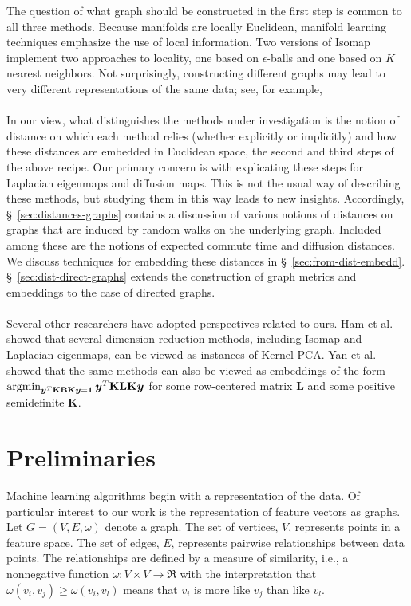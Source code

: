 \documentclass[10pt,twocolumn]{article}
\numberwithin{equation}{section}
\newcommand{\argmin}{\operatornamewithlimits{argmin}}
\begin{document}
The question of what graph should be constructed in the first step is
common to all three methods.  Because manifolds are locally Euclidean,
manifold learning techniques emphasize the use of local information.   
Two versions of Isomap implement two approaches to locality, one
based on $\epsilon$-balls and one based on $K$ nearest neighbors.
Not surprisingly, constructing different graphs may lead to very
different representations of the same data;
 see, for example,
\cite{maier08:_influen,hein07:_conver_laplac} \\ \\
%
%
\noindent
In our view, what distinguishes the methods under investigation is 
the notion of distance on which each method relies (whether explicitly
or implicitly) and how these distances are embedded in Euclidean space, 
the second and third steps of the above recipe.  Our primary 
concern is with explicating these steps for Laplacian eigenmaps
and diffusion maps.  This is not the usual way of describing these methods,
but studying them in this way leads to new insights.
Accordingly, \S~\ref{sec:distances-graphs} contains a discussion of various
notions of distances on graphs that are induced by random walks on the
underlying graph. Included among these are the notions of expected
commute time and diffusion distances. 
We discuss techniques for embedding these
distances in \S~\ref{sec:from-dist-embedd}.
\S~\ref{sec:dist-direct-graphs}
extends the construction of graph metrics and embeddings to the
case of directed graphs. \\ \\
%
\noindent
Several other researchers have adopted perspectives related to ours.
Ham et al.\
 \cite{ham04} showed that several dimension reduction methods, including
Isomap and Laplacian eigenmaps, can be viewed as instances of
Kernel PCA. 
Yan et al.\ 
\cite{yan07:_graph_embed_exten} showed that the same
methods can also be viewed as embeddings of the
form $\argmin_{\bm{y}^{T} \mathbf{K}\mathbf{B} \mathbf{K} \bm{y} =
  \bm{1}} \bm{y}^{T} \mathbf{K} \mathbf{L} \mathbf{K} \bm{y}$ for some
row-centered matrix $\mathbf{L}$ and some positive semidefinite 
$\mathbf{K}$.


\section{Preliminaries}
Machine learning algorithms begin with a
representation of the data. 
Of particular interest to our work is the
representation of feature vectors as graphs. 
Let $G = (V,E,\omega)$ denote a graph. 
The set of vertices, $V$, represents points in a feature space.
The set of edges, $E$, represents pairwise relationships between
data points.  The relationships are defined by a measure of
similarity, i.e., a nonnegative function 
$\omega: V \times V \rightarrow \Re$ with the interpretation that
$\omega(v_i, v_j) \geq \omega(v_i,v_l)$ means that $v_i$ is more
like $v_j$ than like $v_l$. 
\end{document}
